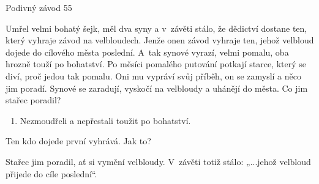 Podivný závod
55 %

Umřel velmi bohatý šejk, měl dva syny a v~závěti stálo, že dědictví dostane ten, který vyhraje závod na velbloudech. Jenže onen závod vyhraje ten, jehož velbloud dojede do cílového města poslední. A~tak synové vyrazí, velmi pomalu, oba hrozně touží po bohatství. Po měsíci pomalého putování potkají starce, který se diví, proč jedou tak pomalu. Oni mu vypráví svůj příběh, on se zamyslí a něco jim poradí. Synové se zaradují, vyskočí na velbloudy a uhánějí do města. Co jim stařec poradil?

\begin{enumerate}
\item Nezmoudřeli a nepřestali toužit po bohatství.
\end{enumerate}

Ten kdo dojede první vyhrává. Jak to?

Stařec jim poradil, ať si vymění velbloudy. V~závěti totiž stálo: „...jehož velbloud přijede do cíle poslední“.

